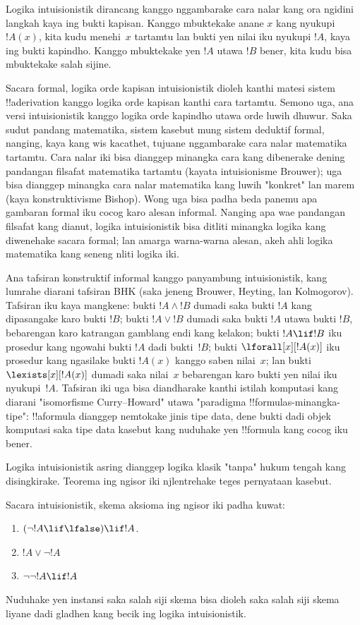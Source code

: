 \documentclass[../../../include/open-logic-section]{subfiles}
\begin{document}
Logika intuisionistik dirancang
kanggo nggambarake cara nalar
kang ora ngidini langkah kaya
ing bukti kapisan. Kanggo
mbuktekake anane $x$ kang
nyukupi~$!A(x)$, kita kudu
menehi~$x$ tartamtu lan bukti
yen nilai iku nyukupi $!A$,
kaya ing bukti kapindho.
Kanggo mbuktekake yen $!A$
utawa $!B$ bener, kita kudu
bisa mbuktekake salah sijine.

Sacara formal, logika orde kapisan
intuisionistik dioleh kanthi
matesi sistem !!a{derivation}
kanggo logika orde kapisan
kanthi cara tartamtu.
Semono uga, ana versi
intuisionistik kanggo logika
orde kapindho utawa orde
luwih dhuwur. Saka sudut
pandang matematika, sistem
kasebut mung sistem deduktif
formal, nanging, kaya kang
wis kacathet, tujuane
nggambarake cara nalar
matematika tartamtu.
Cara nalar iki bisa dianggep
minangka cara kang dibenerake
dening pandangan filsafat
matematika tartamtu (kayata
intuisionisme Brouwer);
uga bisa dianggep minangka
cara nalar matematika kang
luwih "konkret" lan marem
(kaya konstruktivisme Bishop).
Wong uga bisa padha beda
panemu apa gambaran formal
iku cocog karo alesan informal.
Nanging apa wae pandangan
filsafat kang dianut,
logika intuisionistik bisa
ditliti minangka logika
kang diwenehake sacara
formal; lan amarga warna-warna
alesan, akeh ahli logika
matematika kang seneng
nliti logika iki.

Ana tafsiran konstruktif
informal kanggo panyambung
intuisionistik, kang lumrahe
diarani tafsiran BHK
(saka jeneng Brouwer,
Heyting, lan Kolmogorov).
Tafsiran iku kaya mangkene:
bukti $!A \land !B$
dumadi saka bukti $!A$
kang dipasangake karo
bukti $!B$; bukti
$!A \lor !B$ dumadi
saka bukti $!A$ utawa
bukti $!B$, bebarengan
karo katrangan gamblang
endi kang kelakon;
bukti $!A \lif !B$
iku prosedur kang ngowahi
bukti $!A$ dadi bukti~$!B$;
bukti $\lforall[x][!A(x)]$
iku prosedur kang ngasilake
bukti $!A(x)$ kanggo
saben nilai~$x$; lan bukti
$\lexists[x][!A(x)]$
dumadi saka nilai~$x$
bebarengan karo bukti
yen nilai iku nyukupi~$!A$.
Tafsiran iki uga bisa
diandharake kanthi istilah
komputasi kang diarani
"isomorfisme Curry--Howard"
utawa "paradigma
!!{formula}s-minangka-tipe":
!!a{formula} dianggep
nemtokake jinis tipe data,
dene bukti dadi objek
komputasi saka tipe data
kasebut kang nuduhake
yen !!{formula} kang
cocog iku bener.

Logika intuisionistik asring
dianggep logika klasik
"tanpa" hukum tengah
kang disingkirake.
Teorema ing ngisor iki
njlentrehake teges
pernyataan kasebut.
\begin{thm}
Sacara intuisionistik,
skema aksioma ing ngisor
iki padha kuwat:
\begin{enumerate}
\item $(\lnot !A \lif \lfalse) \lif !A$.
\item $!A \lor \lnot !A$
\item $\lnot \lnot !A \lif !A$
\end{enumerate}
\end{thm}
Nuduhake yen instansi saka
salah siji skema bisa dioleh
saka salah siji skema liyane
dadi gladhen kang becik
ing logika intuisionistik.
\end{document}
